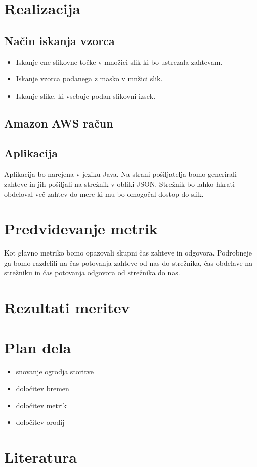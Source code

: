 \section{Realizacija}

\subsection{Način iskanja vzorca}
\begin{itemize}
\item Iskanje ene slikovne točke v množici slik ki bo ustrezala zahtevam.
\item Iskanje vzorca podanega z masko v mnžici slik.
\item Iskanje slike, ki vsebuje podan slikovni izsek.
\end{itemize}

\subsection{Amazon AWS račun}

\subsection{Aplikacija}
Aplikacija bo narejena v jeziku Java. Na strani pošiljatelja bomo generirali zahteve in jih pošiljali na strežnik v obliki JSON. Strežnik bo lahko hkrati obdeloval več zahtev do mere ki mu bo omogočal dostop do slik.


\section{Predvidevanje metrik}
Kot glavno metriko bomo opazovali skupni čas zahteve in odgovora. Podrobneje ga bomo razdelili na čas potovanja zahteve od nas do strežnika, čas obdelave na strežniku in čas potovanja odgovora od strežnika do nas.

\section{Rezultati meritev}

\section{Plan dela}
\begin{itemize}
\item snovanje ogrodja storitve
\item določitev bremen
\item določitev metrik
\item določitev orodij
\end{itemize}

\section{Literatura}

